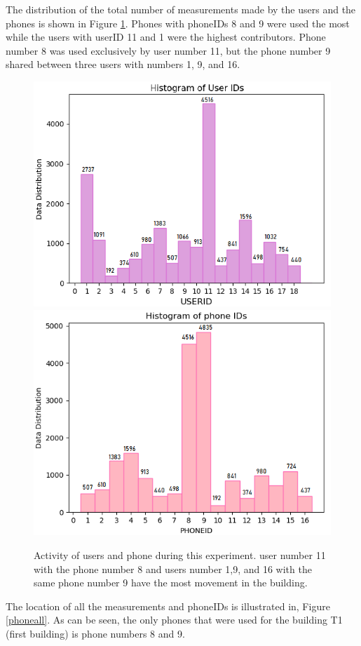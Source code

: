 The distribution of the total number of measurements made by the users and the phones is shown in Figure \ref{userphone}. Phones with phoneIDs 8 and 9 were used the most while the users with userID 11 and 1 were the highest contributors. Phone number 8 was used exclusively by user number 11, but the phone number 9 shared between three users with numbers 1, 9, and 16.

\begin{figure}[!h]
    \centering
    \includegraphics[width=.5\textwidth]{image/Chapters/Chapter6/userID_data.png}\hfill
    \includegraphics[width=.5\textwidth]{image/Chapters/Chapter6/phoneID_data.png}
    \\[\smallskipamount]    
    \caption{Activity of users and phone during this experiment. user number 11 with the phone number 8 and users number 1,9, and 16 with the same phone number 9 have the most movement in the building.}
    \label{userphone}
\end{figure}


The location of all the measurements and phoneIDs is illustrated in, Figure \ref{phoneall}. As can be seen, the only phones that were used for the building T1 (first building) is phone numbers 8 and 9. 


